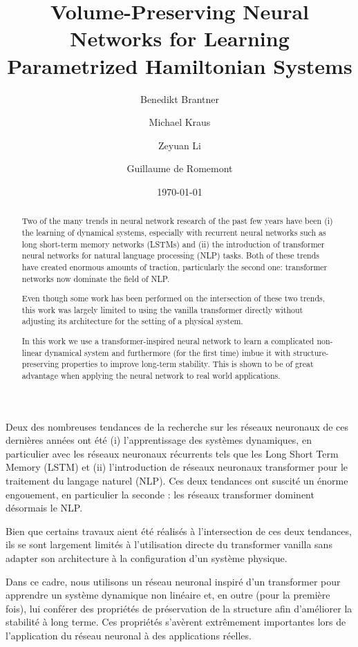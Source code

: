 \documentclass[proc]{edpsmath}
\begin{document}
\title{Volume-Preserving Neural Networks for Learning Parametrized Hamiltonian Systems}%
%
\author{Benedikt Brantner}\address{Max-Planck-Institut f\"ur Plasmaphysik, Boltzmannstra\ss{}e 2, 85748 Garching}
\author{Michael Kraus} %
\author{Zeyuan Li}\address{Zentrum Mathematik, Technische Universität München, Boltzmannstra\ss{}e 3, 85748 Garching, Germany}
\author{Guillaume de Romemont} \address{DAAA, ONERA, Université Paris Saclay, F-92322, Châtillon, France}
%
\date{\today}

\begin{abstract} 
    Two of the many trends in neural network research of the past few years have been (i) the learning of dynamical systems, especially with recurrent neural networks such as long short-term memory networks (LSTMs) and (ii) the introduction of transformer neural networks for natural language processing (NLP) tasks. Both of these trends have created enormous amounts of traction, particularly the second one: transformer networks now dominate the field of NLP. 

    Even though some work has been performed on the intersection of these two trends, this work was largely limited to using the vanilla transformer directly without adjusting its architecture for the setting of a physical system.

    In this work we use a transformer-inspired neural network to learn a complicated non-linear dynamical system and furthermore (for the first time) imbue it with structure-preserving properties to improve long-term stability. This is shown to be of great advantage when applying the neural network to real world applications.
\end{abstract}
%
\begin{resume} 
    Deux des nombreuses tendances de la recherche sur les réseaux neuronaux de ces dernières années ont été (i) l'apprentissage des systèmes dynamiques, en particulier avec les réseaux neuronaux récurrents tels que les Long Short Term Memory (LSTM) et (ii) l'introduction de réseaux neuronaux transformer pour le traitement du langage naturel (NLP). Ces deux tendances ont suscité un énorme engouement, en particulier la seconde : les réseaux transformer dominent désormais le NLP. 

    Bien que certains travaux aient été réalisés à l'intersection de ces deux tendances, ils se sont largement limités à l'utilisation directe du transformer vanilla sans adapter son architecture à la configuration d'un système physique.
    
    Dans ce cadre, nous utilisons un réseau neuronal inspiré d'un transformer pour apprendre un système dynamique non linéaire et, en outre (pour la première fois), lui conférer des propriétés de préservation de la structure afin d'améliorer la stabilité à long terme. Ces propriétés s'avèrent extrêmement importantes lors de l'application du réseau neuronal à des applications réelles.
    
\end{resume}
\end{document}
